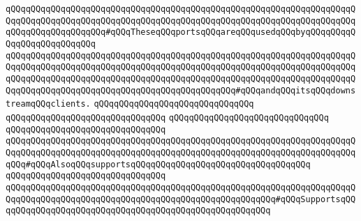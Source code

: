 \verb|qQQqqQQqqQQqqQQqqQQqqQQqqQQqqQQq|\verb|qQQqqQQqqQQqqQQqqQQqqQQqqQQqqQQqqQQqqQQqqQQqqQQqqQQqqQQqqQQqqQQqqQQqqQQqqQQqqQQqqQQqqQQqqQQqqQQqqQQqqQQqqQQqqQQqqQQqqQQqqQQqqQQq#qQQqTheseqQQqportsqQQqareqQQqusedqQQqbyqQQqqQQqqQQqqQQqqQQqqQQqqQQq|\newline
\verb|qQQqqQQqqQQqqQQqqQQqqQQqqQQqqQQqqQQqqQQqqQQqqQQqqQQqqQQqqQQqqQQqqQQqqQQqqQQqqQQqqQQqqQQqqQQqqQQqqQQqqQQqqQQqqQQqqQQqqQQqqQQqqQQqqQQqqQQqqQQqqQQqqQQqqQQqqQQqqQQqqQQqqQQqqQQqqQQqqQQqqQQqqQQqqQQqqQQqqQQqqQQqqQQqqQQqqQQqqQQqqQQqqQQqqQQqqQQqqQQqqQQqqQQqqQQqqQQq#qQQqandqQQqitsqQQqdownstreamqQQqclients.|\newline
\newline
\verb|qQQqqQQqqQQqqQQqqQQqqQQqqQQqqQQq|\newline
\newline
\verb|qQQqqQQqqQQqqQQqqQQqqQQqqQQqqQQq|\newline
\newline
\verb|qQQqqQQqqQQqqQQqqQQqqQQqqQQqqQQq|\newline
\verb|qQQqqQQqqQQqqQQqqQQqqQQqqQQqqQQq|\newline
\verb|qQQqqQQqqQQqqQQqqQQqqQQqqQQqqQQq|\verb|qQQqqQQqqQQqqQQqqQQqqQQqqQQqqQQqqQQqqQQqqQQqqQQqqQQqqQQqqQQqqQQqqQQqqQQqqQQqqQQqqQQqqQQqqQQqqQQqqQQqqQQqqQQqqQQq#qQQqAlsoqQQqsupportsqQQqqQQqqQQqqQQqqQQqqQQqqQQqqQQqqQQq|\newline
\newline
\verb|qQQqqQQqqQQqqQQqqQQqqQQqqQQqqQQq|\newline
\verb|qQQqqQQqqQQqqQQqqQQqqQQqqQQqqQQq|\verb|qQQqqQQqqQQqqQQqqQQqqQQqqQQqqQQqqQQqqQQqqQQqqQQqqQQqqQQqqQQqqQQqqQQqqQQqqQQqqQQqqQQqqQQqqQQq#qQQqSupportsqQQqqQQqqQQqqQQqqQQqqQQqqQQqqQQqqQQqqQQqqQQqqQQqqQQqqQQq|\newline
